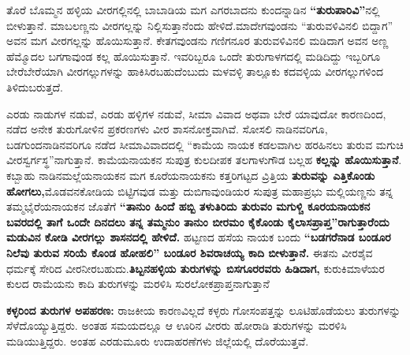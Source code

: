 ತೊರೆ ಬೊಮ್ಮನ ಹಳ್ಳಿಯ ವೀರಗಲ್ಲಿನಲ್ಲಿ ಬಾಬಾಡಿಯ ಮಗ ಎಗರಬಾದನು ಕುಂದನ್ನಾಡಿನ \textbf{“ತುರುಪಾರಿವಿ”}ನಲ್ಲಿ ಬೀಳುತ್ತಾನೆ. ಮಾಬಲಣ್ಣನು ವೀರಗಲ್ಲನ್ನು ನಿಲ್ಲಿಸುತ್ತಾನೆಂದು ಹೇಳಿದೆ.ಮಾದೇಗವುಂಡನು “ತುರುವಳಿವಿನಲಿ ಬಿದ್ದಾಗ” ಅವನ ಮಗ ವೀರಗಲ್ಲನ್ನು ಹೊಯಿಸುತ್ತಾನೆ. ಕೇತಗವುಂಡನು ಗಣಿಗನೂರ ತುರುವಳಿವಿನಲಿ ಮಡಿದಾಗ ಅವನ ಅಣ್ಣ ಹೆಮ್ಮೊದಲ ಬಗಗಾವುಂಡ ಕಲ್ಲ ಹೊಯಿಸುತ್ತಾನೆ. ಇವರಿಬ್ಬರೂ ಒಂದೇ ತುರುಗಾಳಗದಲ್ಲಿ ಮಡಿದಿದ್ದು ಇಬ್ಬರಿಗೂ ಬೇರೆಬೇರೆಯಾಗಿ ವೀರಗಲ್ಲುಗಳನ್ನು ಹಾಕಿಸಿರಬಹುದೆಂಬುದು ಮಳವಳ್ಳಿ ತಾಲ್ಲೂಕು ಕದವಳ್ಳಿಯ ವೀರಗಲ್ಲುಗಳಿಂದ ತಿಳಿದುಬರುತ್ತದೆ.

ಎರಡು ನಾಡುಗಳ ನಡುವೆ, ಎರಡು ಹಳ್ಳಿಗಳ ನಡುವೆ, ಸೀಮಾ ವಿವಾದ ಅಥವಾ ಬೇರೆ ಯಾವುದೋ ಕಾರಣದಿಂದ, ನಡೆದ ಅನೇಕ ತುರುಗೋಳಿನ ಪ್ರಕರಣಗಳು ವೀರ ಶಾಸನೋಕ್ತವಾಗಿವೆ. ಸೋಸಲಿ ನಾಡಿನವರಿಗೂ, ಬಡಗುಂದನಾಡಿನವರಿಗೂ ನಡೆದ ಸೀಮಾವಿವಾದದಲ್ಲಿ “ಕಾಮೆಯ ನಾಯಕ ಕಡಲವಾಗಿಲ ಹರಹಿನಲು ತುರುವ ಮಗುಚಿ ವೀರಸ್ವರ್ಗಸ್ಥ”ನಾಗುತ್ತಾನೆ. ಕಾಮೆಯನಾಯಕನ ಸುಪುತ್ರ ಕುಲದೀಪಕ ತಲಗಾಳುಗೌಡ ಬಲ್ಲಹ \textbf{ಕಲ್ಲನ್ನು ಹೊಯಿಸುತ್ತಾನೆ}. ಕಬ್ಬಾಹು ನಾಡಿನ\break ಮಲ್ಲೆಯನಾಯಕನ ಮಗ ಕೂರೆಯನಾಯಕನು ಕತ್ತರಿಗಟ್ಟದ ವ್ರಿತ್ತಿಯ \textbf{ತುರುವನ್ನು ಎತ್ತಿಕೊಂಡು ಹೋಗಲು,}\break ಮೊಡವನಕೋಡಿಯ ಬಿಟ್ಟಿಗವುಡ ಮತ್ತು ದುಬಿಗಾವುಂಡಿಯರ ಸುಪುತ್ರ ಮಹಾಪ್ರಭು ಮಲ್ಲಿಯಣ್ಣನು ತನ್ನ ತಮ್ಮ\break ಭೈರೆಯನಾಯಕನ ಜೊತೆಗೆ \textbf{“ತಾನುಂ ಹಿಂದೆ ಹಬ್ಬಿ ತಳುತಿರಿದು ತುರುವಂ ಮಗುಳ್ಚಿ ಕೂರಯನಾಯಕನ ಬವರದಲ್ಲಿ ತಾಗೆ ಒಂದೇ ದಿನದಲು ತನ್ನ ತಮ್ಮನುಂ ತಾನುಂ ಬೀರಮಂ ಕೈಕೊಂಡು ಕೈಲಾಸಪ್ರಾಪ್ತ”ರಾಗುತ್ತಾರೆಂದು ಮಡುವಿನ ಕೋಡಿ ವೀರಗಲ್ಲು ಶಾಸನದಲ್ಲಿ ಹೇಳಿದೆ.} ಹಟ್ಟಣದ ಹಸೆಯ ನಾಯಕ ಬಂದು \textbf{“ಬಡಗರೆನಾಡ ಬಂಡೂರ ನಿಲೆವು ತುರುವ ಸರಿಯೆ ಕೊಂಡ ಹೋಹಲಿ” ಬಂಡೂರ ಶಿವರಾಚಯ್ಯ ಕಾದಿ ಬೀಳುತ್ತಾನೆ.} ಈತನು ವೀರಶೈವ ಧರ್ಮಕ್ಕೆ ಸೇರಿದ ವೀರನೀರಬಹುದು.\break \textbf{ತಿಬ್ಬನಹಳ್ಳಿಯ ತುರುಗಳನ್ನು ಬಿಸಗೂರರವರು ಹಿಡಿದಾಗ,} ಕುರುಕಿಮಾಳೆಯರ ಕುಲದ ರಾಮೆಯನು ಕಾದಿ ತುರುಗಳನ್ನು ಮರಳಿಸಿ ಸುರಲೋಕ\-ಪ್ರಾಪ್ತನಾಗುತ್ತಾನೆ

\textbf{ಕಳ್ಳರಿಂದ ತುರುಗಳ ಅಪಹರಣ: } ರಾಜಕೀಯ ಕಾರಣವಿಲ್ಲದೆ ಕಳ್ಳರು ಗೋಸಂಪತ್ತನ್ನು ಲೂಟಿಹೊಡೆಯಲು ತುರುಗಳನ್ನು ಸೆಳೆದೊಯ್ಯುತ್ತಿದ್ದರು. ಅಂತಹ ಸಮಯದಲ್ಲೂ ಆ ಊರಿನ ವೀರರು ಹೋರಾಡಿ ತುರುಗಳನ್ನು ಮರಳಿಸಿ ಮಡಿಯುತ್ತಿದ್ದರು. ಅಂತಹ ಎರಡುಮೂರು ಉದಾಹರಣೆಗಳು ಜಿಲ್ಲೆಯಲ್ಲಿ ದೊರೆಯುತ್ತವೆ.

